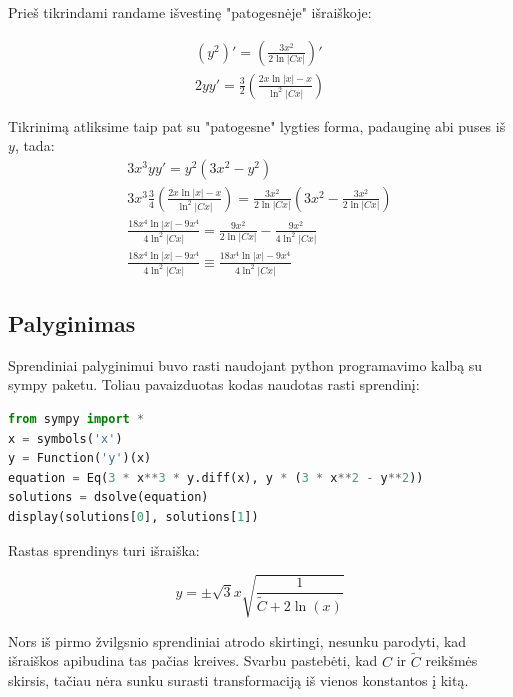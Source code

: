 \documentclass[11pt]{article}
\begin{document}
Prieš tikrindami randame išvestinę "patogesnėje" išraiškoje:

\begin{equation}
\begin{split}
(y^2)'=\left(\frac{3x^2}{2\ln|Cx|}\right)'\\
2yy'=\frac{3}{2}\left(\frac{2x\ln|x|-x}{\ln^2|Cx|}\right)
\end{split}
\end{equation}

Tikrinimą atliksime taip pat su "patogesne" lygties forma, padauginę abi puses iš $y$, tada:
\begin{equation}
\begin{split}
3x^3yy'=y^2(3x^2-y^2)\\
3x^3\frac{3}{4}\left(\frac{2x\ln|x|-x}{\ln^2|Cx|}\right)=\frac{3x^2}{2\ln|Cx|}\left(3x^2-\frac{3x^2}{2\ln|Cx|}\right)\\
\frac{18x^4\ln|x|-9x^4}{4\ln^2|Cx|}=\frac{9x^2}{2\ln|Cx|}-\frac{9x^2}{4\ln^2|Cx|}\\
\frac{18x^4\ln|x|-9x^4}{4\ln^2|Cx|}\equiv\frac{18x^4\ln|x|-9x^4}{4\ln^2|Cx|}
\end{split}
\end{equation}

\subsection{Palyginimas}

Sprendiniai palyginimui buvo rasti naudojant 
python programavimo kalbą su sympy paketu. 
Toliau pavaizduotas kodas naudotas rasti sprendinį:

\begin{lstlisting}[language=Python]
from sympy import *
x = symbols('x')
y = Function('y')(x)
equation = Eq(3 * x**3 * y.diff(x), y * (3 * x**2 - y**2))
solutions = dsolve(equation)
display(solutions[0], solutions[1])
\end{lstlisting}

Rastas sprendinys turi išraiška:

\begin{equation}
y=\pm\sqrt 3x\sqrt{\frac{1}{\widetilde{C}+2\ln(x)}}
\end{equation}

Nors iš pirmo žvilgsnio sprendiniai atrodo skirtingi, nesunku parodyti, 
kad išraiškos apibudina tas pačias kreives. Svarbu pastebėti, kad $C$ ir $\widetilde{C}$ reikšmės
skirsis, tačiau nėra sunku surasti transformaciją iš vienos konstantos į kitą.
\end{document}
